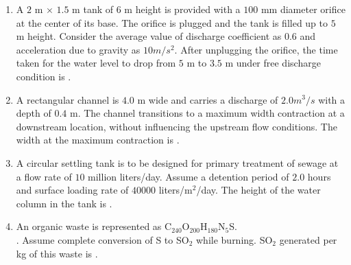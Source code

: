 \documentclass[journal,12pt,onecolumn]{article}
\theoremstyle{remark}
\begin{document}
\begin{enumerate}
    \hfill{}
    
    \item A $2$ m $\times$ $1.5$ m tank of $6$ m height is provided with a $100$ mm diameter orifice at the
    center of its base. The orifice is plugged and the tank is filled up to $5$ m height.
    Consider the average value of discharge coefficient as $0.6$ and acceleration due to
    gravity  as $10 m/s^2$. After unplugging the orifice, the time  taken for
    the water level to drop from $5$ m to $3.5$ m under free discharge condition is
    \underline{\hspace{2cm}} .
    
    \hfill{}
    
    \item A rectangular channel is $4.0$ m wide and carries a discharge of $2.0 m^3/s$ with a depth
    of $0.4$ m. The channel transitions to a maximum width contraction at a downstream
    location, without influencing the upstream flow conditions. The width  at
    the maximum contraction is \underline{\hspace{2cm}} .
    
    \hfill{}
    
    \item A circular settling tank is to be designed for primary treatment of sewage at a flow
    rate of $10$ million liters/day. Assume a detention period of $2.0$ hours and surface
    loading rate of $40000$ liters/m$^2$/day. The height  of the water column in
    the tank is \underline{\hspace{2cm}} .
    
    \hfill{}

    \item An organic waste is represented as C$_{240}$O$_{200}$H$_{180}$N$_5$S.\\
    .
    Assume complete conversion of S to SO$_2$ while burning.
    SO$_2$ generated  per kg of this waste is \underline{\hspace{2cm}}
    .
    
    \hfill{}
    

\end{enumerate}
\end{document}
